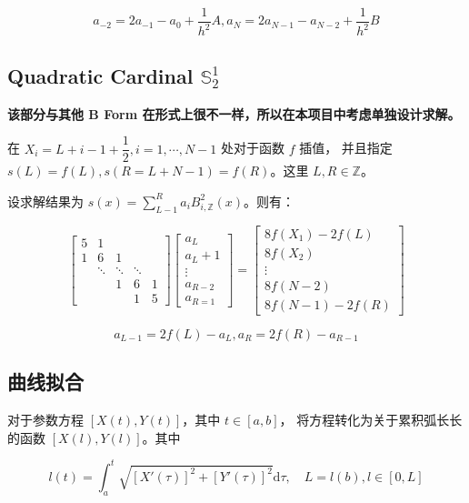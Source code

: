 \documentclass[lang=cn,a4paper,newtx,bibend=bibtex]{elegantpaper}
\newcommand{\dd}{\mathrm{d}}
\newcommand{\SBB}{\mathbb{S}}
\newcommand{\Int}[4]{\int_{#1}^{#2}{#3}{\dd {#4}}}
\begin{document}
\[a_{-2} = 2a_{-1} - a_{0} + \dfrac1{h^2}A, a_N = 2a_{N-1} - a_{N-2} + \dfrac1{h^2}B\]


\subsection{Quadratic Cardinal $\SBB_2^1$}

\textbf{该部分与其他 B Form 在形式上很不一样，所以在本项目中考虑单独设计求解。}

在 $X_i = L + i - 1 + \dfrac12, i = 1, \cdots, N-1$ 处对于函数 $f$ 插值，
并且指定 $s(L) = f(L), s(R = L + N-1) = f(R)$。这里 $L, R\in \mathbb{Z}$。

设求解结果为  $s(x) = \sum\limits_{L-1}^R a_i B_{i, \mathbb{Z}}^2(x)$。则有：

\begin{equation*}
\begin{bmatrix}
  5 & 1 &   &  & \\
  1 & 6 & 1 &  & \\
   & \ddots & \ddots &\ddots & \\
  & & 1 & 6 & 1 \\
  & & & 1 & 5
\end{bmatrix}
\begin{bmatrix}
a_L \\
a_L + 1 \\
\vdots \\
a_{R - 2} \\
a_{R = 1}
\end{bmatrix}
=
\begin{bmatrix}
  8 f(X_1) - 2f(L) \\
  8 f(X_2) \\
  \vdots \\
  8 f(N-2) \\
  8 f(N-1) - 2f(R)
  \end{bmatrix}
\end{equation*}

\[a_{L-1} = 2f(L) - a_{L}, a_R = 2f(R) - a_{R-1}\]


\subsection{曲线拟合}

对于参数方程 $[X(t), Y(t)]$，其中 $t\in [a, b]$，
将方程转化为关于累积弧长长的函数 $[X(l), Y(l)]$。其中

\[l(t) = \Int{a}{t}{\sqrt{[X'(\tau)]^2 + [Y'(\tau)]^2}}{\tau}, \quad L = l(b), l \in [0, L]\]
\end{document}
